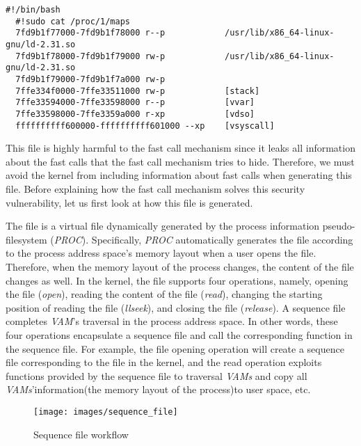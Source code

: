 \begin{lstlisting}[style=BASHStyle]
  #!/bin/bash
  #!sudo cat /proc/1/maps
  7fd9b1f77000-7fd9b1f78000 r--p            /usr/lib/x86_64-linux-gnu/ld-2.31.so
  7fd9b1f78000-7fd9b1f79000 rw-p            /usr/lib/x86_64-linux-gnu/ld-2.31.so
  7fd9b1f79000-7fd9b1f7a000 rw-p  
  7ffe334f0000-7ffe33511000 rw-p            [stack]
  7ffe33594000-7ffe33598000 r--p            [vvar]
  7ffe33598000-7ffe3359a000 r-xp            [vdso]
  ffffffffff600000-ffffffffff601000 --xp    [vsyscall]
\end{lstlisting}


This file is highly harmful to the fast call mechanism since 
it leaks all information about the fast calls that the fast call 
mechanism tries to hide. Therefore, we must avoid the kernel from 
including information about fast calls when generating this file. 
Before explaining how the fast call mechanism solves this security 
vulnerability, let us first look at how this file is generated.

The file is a virtual file dynamically generated by the process 
information pseudo-filesystem (\emph{PROC}). Specifically, \emph{PROC} automatically 
generates the file according to the process address space's memory 
layout when a user opens the file. Therefore, when the memory layout 
of the process changes, the content of the file changes as well. 
In the kernel, the file supports four operations, namely, opening 
the file (\emph{open}), reading the content of the file (\emph{read}), changing 
the starting position of reading the file (\emph{llseek}), and closing the 
file (\emph{release}). A sequence file completes \emph{VAM}'s traversal in the 
process address space. In other words, these four operations encapsulate 
a sequence file and call the corresponding function in the sequence file. 
For example, the file opening operation will create a sequence file 
corresponding to the file in the kernel, and the read operation exploits 
functions provided by the sequence file to traversal \emph{VAMs} and copy all 
\emph{VAMs}'information(the memory layout of the process)to user space, etc.
 
\begin{figure}[tbp]
  \centering
  \texttt{[image: images/sequence\_file]}
  \caption[Short description]{Sequence file workflow}
  \label{fig:sequence_file}
\end{figure}

